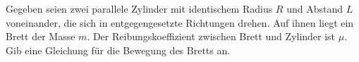 \begin{Exercise}[label = Brett auf Rollen, origin = Vorbereitungsaufgabe für die
4. Runde zur 47. IPhO 2016, difficulty = 3, title = Brett auf Rollen]
Gegeben seien zwei parallele Zylinder mit identischem Radius $R$ und Abstand $L$ voneinander, die sich in entgegengesetzte Richtungen drehen. Auf ihnen liegt ein Brett der Masse $m$. Der Reibungskoeffizient zwischen Brett und Zylinder ist $\mu$.\\
Gib eine Gleichung für die Bewegung des Bretts an.  
\end{Exercise}